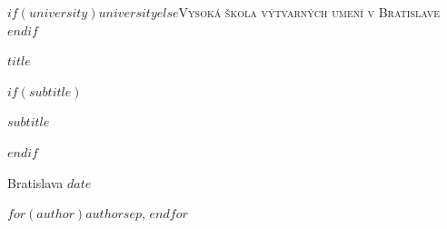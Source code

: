 \documentclass[11pt,a4paper]{report}
\begin{document}
\begin{titlepage}
    \centering
    \vspace*{1cm}

    {\scshape\Large $if(university)$$university$$else$Vysoká škola výtvarných umení v Bratislave$endif$ \par}

    \vspace{3.2cm}

    {\huge\bfseries $title$ \par}

    $if(subtitle)$
    \vspace{0.7cm}
    {\Large\itshape $subtitle$ \par}
    $endif$

    \vfill

    \begin{flushleft}
      {\large Bratislava $date$ \par}
      \vspace{0.3cm}
      {\large $for(author)$$author$$sep$, $endfor$ \par}
    \end{flushleft}
\end{titlepage}
\end{document}
